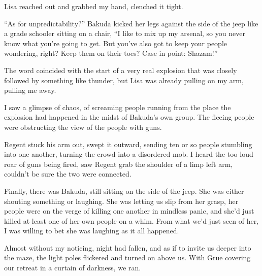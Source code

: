 Lisa reached out and grabbed my hand, clenched it tight.



``As for unpredictability?''  Bakuda kicked her legs against the side of the jeep like a grade schooler sitting on a chair, ``I like to mix up my arsenal, so you never know what you're going to get.  But you've also got to keep your people wondering, right?  Keep them on their toes?  Case in point: Shazam!''



The word coincided with the start of a very real explosion that was closely followed by something like thunder, but Lisa was already pulling on my arm, pulling me away.



I saw a glimpse of chaos, of screaming people running from the place the explosion had happened in the midst of Bakuda's own group.  The fleeing people were obstructing the view of the people with guns.



Regent stuck his arm out, swept it outward, sending ten or so people stumbling into one another, turning the crowd into a disordered mob.  I heard the too-loud roar of guns being fired, saw Regent grab the shoulder of a limp left arm, couldn't be sure the two were connected.



Finally, there was Bakuda, still sitting on the side of the jeep.  She was either shouting something or laughing.  She was letting us slip from her grasp, her people were on the verge of killing one another in mindless panic, and she'd just killed at least one of her own people on a whim.  From what we'd just seen of her, I was willing to bet she was laughing as it all happened.



Almost without my noticing, night had fallen, and as if to invite us deeper into the maze, the light poles flickered and turned on above us.  With Grue covering our retreat in a curtain of darkness, we ran.





